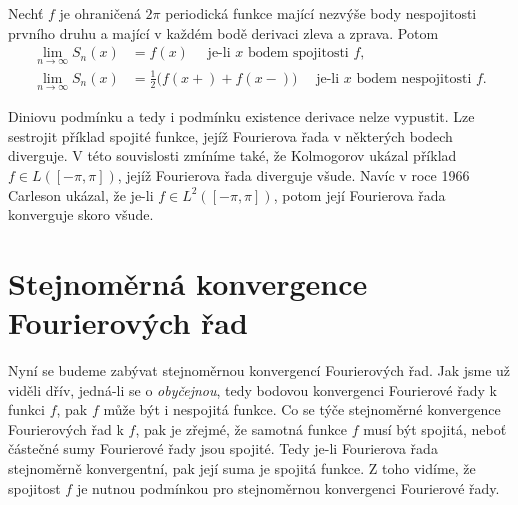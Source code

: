 \begin{theorem}\label{v_4.31}
Nechť $f$ je ohraničená $2\pi$ periodická funkce mající nezvýše body nespojitosti prvního druhu a mající v každém bodě derivaci zleva a zprava. Potom
\begin{align*}
\lim \limits _{n \to \infty} S_n (x) &= f (x) \quad \textrm{ je-li } x \textrm{ bodem spojitosti } f,\\
\lim \limits _{n \to \infty} S_n (x) &= \frac{1}{2} \Big(f(x+) + f(x-)\Big) \quad \textrm{ je-li } x \textrm{ bodem nespojitosti } f.
\end{align*}
\end{theorem}

\begin{poznamka}\label{p_4.32}
Diniovu podmínku a tedy i podmínku existence derivace nelze vypustit. Lze sestrojit příklad spojité funkce, jejíž Fourierova řada v některých bodech diverguje. V této souvislosti zmíníme také, že Kolmogorov ukázal příklad $f \in L([-\pi, \pi])$, jejíž Fourierova řada diverguje všude. Navíc v roce 1966 Carleson ukázal, že je-li $f \in L^2([-\pi, \pi])$, potom její Fourierova řada konverguje skoro všude.
\end{poznamka}



\section{Stejnoměrná konvergence Fourierových řad}

Nyní se budeme zabývat stejnoměrnou konvergencí Fourierových řad. Jak jsme už viděli dřív, jedná-li se o \textit{obyčejnou}, tedy bodovou konvergenci Fourierové řady k funkci $f$, pak $f$ může být i nespojitá funkce. Co se týče stejnoměrné konvergence Fourierových řad k $f$, pak je zřejmé, že samotná funkce $f$ musí být spojitá, neboť částečné sumy Fourierové řady jsou spojité. Tedy je-li Fourierova řada stejnoměrně konvergentní, pak její suma je spojitá funkce. Z toho vidíme, že spojitost $f$ je nutnou podmínkou pro stejnoměrnou konvergenci Fourierové řady.


